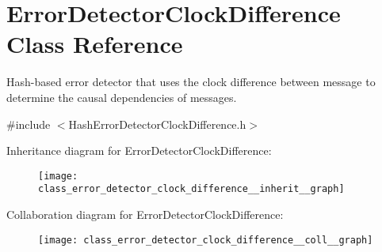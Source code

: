 \hypertarget{class_error_detector_clock_difference}{}\section{Error\+Detector\+Clock\+Difference Class Reference}
\label{class_error_detector_clock_difference}


Hash-\/based error detector that uses the clock difference between message to determine the causal dependencies of messages.  




{\ttfamily \#include $<$Hash\+Error\+Detector\+Clock\+Difference.\+h$>$}



Inheritance diagram for Error\+Detector\+Clock\+Difference\+:\nopagebreak
\begin{figure}[H]
\begin{center}
\leavevmode
\texttt{[image: class\_error\_detector\_clock\_difference\_\_inherit\_\_graph]}
\end{center}
\end{figure}


Collaboration diagram for Error\+Detector\+Clock\+Difference\+:\nopagebreak
\begin{figure}[H]
\begin{center}
\leavevmode
\texttt{[image: class\_error\_detector\_clock\_difference\_\_coll\_\_graph]}
\end{center}
\end{figure}
